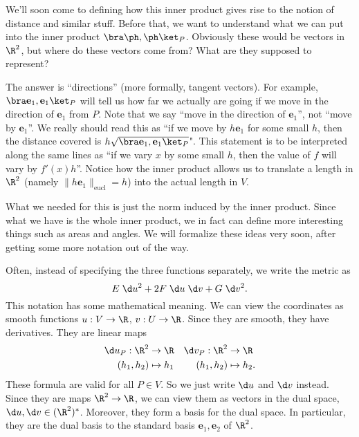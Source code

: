 \documentclass[a4paper]{article}
\begin{document}
We'll soon come to defining how this inner product gives rise to the notion of distance and similar stuff. Before that, we want to understand what we can put into the inner product $\bra\ph, \ph\ket_P$. Obviously these would be vectors in $\R^2$, but where do these vectors come from? What are they supposed to represent?

The answer is ``directions'' (more formally, tangent vectors). For example, $\bra \mathbf{e}_1, \mathbf{e}_1\ket_P$ will tell us how far we actually are going if we move in the direction of $\mathbf{e}_1$ from $P$. Note that we say ``move in the direction of $\mathbf{e}_1$'', not ``move by $\mathbf{e}_1$''. We really should read this as ``if we move by $h\mathbf{e}_1$ for some small $h$, then the distance covered is $h \sqrt{\bra \mathbf{e}_1, \mathbf{e}_1\ket_P}$". This statement is to be interpreted along the same lines as ``if we vary $x$ by some small $h$, then the value of $f$ will vary by $f'(x) h$''. Notice how the inner product allows us to translate a length in $\R^2$ (namely $\|h\mathbf{e}_1\|_{\mathrm{eucl}} = h$) into the actual length in $V$.

What we needed for this is just the norm induced by the inner product. Since what we have is the whole inner product, we in fact can define more interesting things such as areas and angles. We will formalize these ideas very soon, after getting some more notation out of the way.

Often, instead of specifying the three functions separately, we write the metric as
\[
  E\;\d u^2 + 2F \;\d u \;\d v + G \;\d v^2.
\]
This notation has some mathematical meaning. We can view the coordinates as smooth functions $u: V \to \R$, $v: U \to \R$. Since they are smooth, they have derivatives. They are linear maps
\begin{align*}
  \d u_P: \R^2 &\to \R & \d v_P: \R^2 &\to \R\\
  (h_1, h_2) &\mapsto h_1 & (h_1, h_2) &\mapsto h_2.
\end{align*}
These formula are valid for all $P \in V$. So we just write $\d u$ and $\d v$ instead. Since they are maps $\R^2 \to \R$, we can view them as vectors in the dual space, $\d u, \d v \in (\R^2)^*$. Moreover, they form a basis for the dual space. In particular, they are the dual basis to the standard basis $\mathbf{e}_1, \mathbf{e}_2$ of $\R^2$.
\end{document}

